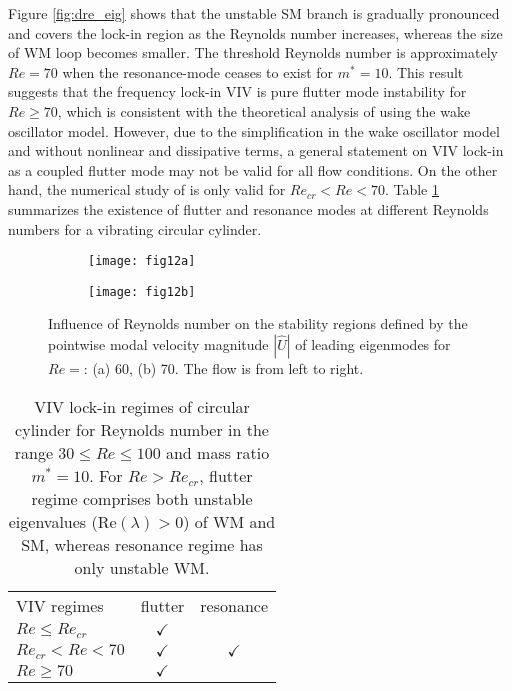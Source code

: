 \documentclass{jfm}
\begin{document}

Figure \ref{fig:dre_eig} shows that the unstable SM branch is gradually pronounced and 
covers the lock-in region as the Reynolds number increases, whereas the size of WM loop becomes smaller. The threshold Reynolds number is approximately $Re = 70$ 
when the resonance-mode ceases to exist for $m^*=10$. 
This result suggests that the frequency lock-in VIV is pure flutter mode 
instability for $Re \ge 70$, which is consistent with the theoretical analysis 
of \cite{DeLangre2006} using the wake oscillator model. However, 
due to the simplification in the wake oscillator model and 
without nonlinear and dissipative terms, a general statement on VIV lock-in
as a  coupled flutter mode may not be valid for all flow conditions. 
On the other hand, the numerical study of \cite{Zhang2015} 
is only valid for $Re_{cr} < Re < 70$. 
Table \ref{tab:Re_VIVpattern} summarizes the existence of flutter 
and resonance modes at different Reynolds numbers for a vibrating circular cylinder. 

\begin{figure}
\centering
\begin{subfigure}{0.495\textwidth}
\centering
    \texttt{[image: fig12a]}
    \caption{}
    \label{fig:re60_mode1}
    \end{subfigure} 
\begin{subfigure}{0.495\textwidth} 
\centering
 \texttt{[image: fig12b]}
	\caption{}
	\label{fig:re70_mode1}
	\end{subfigure}	
        \caption{Influence of Reynolds number on the stability regions defined 
        by the pointwise modal velocity magnitude $|\widehat{U}|$
        of leading eigenmodes for $Re=$: (a) 60, (b) 70.
        The flow is from left to right.
        }
	\label{fig:dre_mode}
\end{figure}


 
 \begin{table}
  \begin{center}
  \begin{tabular}{l c c}
       VIV regimes   & flutter & resonance \\
       $Re \le Re_{cr}$      & $\checkmark$ & \\
       $Re_{cr} < Re < 70$   & $\checkmark$ & $\checkmark$ \\
       $Re \ge 70$           & $\checkmark$ &  
  \end{tabular}
  \caption{VIV lock-in regimes of circular cylinder for Reynolds number 
  in the range $ 30 \le Re \le 100$ 
  and mass ratio $m^*=10$. For $Re > Re_{cr}$, flutter regime comprises 
    both unstable eigenvalues (Re$(\lambda) > 0$) 
     of WM and SM, whereas resonance regime has only unstable WM.}
  \label{tab:Re_VIVpattern}
  \end{center}
\end{table}
\end{document}
